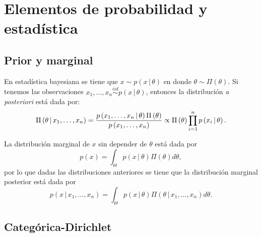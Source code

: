 \chapter{Elementos de probabilidad y estadística}
\label{ap:appA}


\section{Prior y marginal}

En estadística bayesiana se tiene que $x \sim p\left(x \,|\, \theta \right)$ %
en donde $\theta \sim \Pi\left( \theta \right)$. Si tenemos las observaciones %
$x_{1}, \ldots, x_{n} \stackrel{iid}{\sim} p\left(x \,|\, \theta \right)$, %
entonces la distribución \textit{a posteriori} está dada por:
%
\begin{equation} \label{eq:actual}
\Pi\left( \theta \,|\, x_{1},\ldots,x_{n} \right) = \frac{%
p\left(x_{1}, \ldots, x_{n} \,|\, \theta \right) \Pi\left( \theta \right)}%
{p\left( x_{1}, \ldots, x_{n} \right)}%
\propto %
\Pi\left( \theta \right) \prod_{i = 1}^{n} p\left(x_{i} \,|\, \theta \right).
\end{equation}

La distribución marginal de $x$ sin depender de $\theta$ está dada por %
%
\begin{equation} \label{eq:margpr}
p(x) = \int_{\Theta} p\left( x \,|\ \theta \right) \Pi( \theta ) d\theta,
\end{equation}
%
por lo que dadas las distribuciones anteriores se tiene que la distribución marginal posterior está dada por
%
\begin{equation} \label{eq:infer}
p\left( x \,|\, x_{1}, \ldots, x_{n} \right) = %
\int_{\Theta} p\left( x \,|\, \theta \right) %
\Pi\left( \theta \,|\, x_{1}, \ldots, x_{n} \right) d\theta.
\end{equation}


\section{Categórica-Dirichlet}

